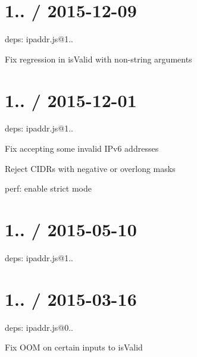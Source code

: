 \section*{1.. / 2015-\/12-\/09 }


\begin{DoxyItemize}
\item deps\+: ipaddr.\+js@1..
\begin{DoxyItemize}
\item Fix regression in {\ttfamily is\+Valid} with non-\/string arguments
\end{DoxyItemize}
\end{DoxyItemize}

\section*{1.. / 2015-\/12-\/01 }


\begin{DoxyItemize}
\item deps\+: ipaddr.\+js@1..
\begin{DoxyItemize}
\item Fix accepting some invalid I\+Pv6 addresses
\item Reject C\+I\+D\+Rs with negative or overlong masks
\end{DoxyItemize}
\item perf\+: enable strict mode
\end{DoxyItemize}

\section*{1.. / 2015-\/05-\/10 }


\begin{DoxyItemize}
\item deps\+: ipaddr.\+js@1..
\end{DoxyItemize}

\section*{1.. / 2015-\/03-\/16 }


\begin{DoxyItemize}
\item deps\+: ipaddr.\+js@0..
\begin{DoxyItemize}
\item Fix O\+OM on certain inputs to {\ttfamily is\+Valid}
\end{DoxyItemize}
\end{DoxyItemize}

